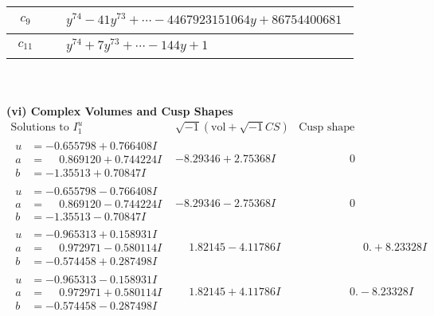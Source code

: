 \documentclass[1p]{elsarticle_modified}
\theoremstyle{definition}
\newcommand{\I}{\sqrt{-1}}
\begin{document}
\begin{tabular}{m{50pt}|m{274pt}}
\hline $$\begin{aligned}c_{9}\end{aligned}$$&$\begin{aligned}
&y^{74}-41 y^{73}+\cdots-4467923151064 y+86754400681
\end{aligned}$\\
\hline $$\begin{aligned}c_{11}\end{aligned}$$&$\begin{aligned}
&y^{74}+7 y^{73}+\cdots-144 y+1
\end{aligned}$\\
\hline
\end{tabular}\\~\\
\newpage\flushleft \textbf{(vi) Complex Volumes and Cusp Shapes}
$$\begin{array}{c|c|c}  
\text{Solutions to }I^u_{1}& \I (\text{vol} + \sqrt{-1}CS) & \text{Cusp shape}\\
 \hline 
\begin{aligned}
u &= -0.655798 + 0.766408 I \\
a &= \phantom{-}0.869120 + 0.744224 I \\
b &= -1.35513 + 0.70847 I\end{aligned}
 & -8.29346 + 2.75368 I & \phantom{-0.000000 } 0 \\ \hline\begin{aligned}
u &= -0.655798 - 0.766408 I \\
a &= \phantom{-}0.869120 - 0.744224 I \\
b &= -1.35513 - 0.70847 I\end{aligned}
 & -8.29346 - 2.75368 I & \phantom{-0.000000 } 0 \\ \hline\begin{aligned}
u &= -0.965313 + 0.158931 I \\
a &= \phantom{-}0.972971 - 0.580114 I \\
b &= -0.574458 + 0.287498 I\end{aligned}
 & \phantom{-}1.82145 - 4.11786 I & \phantom{-0.000000 -}0. + 8.23328 I \\ \hline\begin{aligned}
u &= -0.965313 - 0.158931 I \\
a &= \phantom{-}0.972971 + 0.580114 I \\
b &= -0.574458 - 0.287498 I\end{aligned}
 & \phantom{-}1.82145 + 4.11786 I & \phantom{-0.000000 } 0. - 8.23328 I \\ \hline\begin{aligned}

\end{aligned}
\end{array}$$
\end{document}
